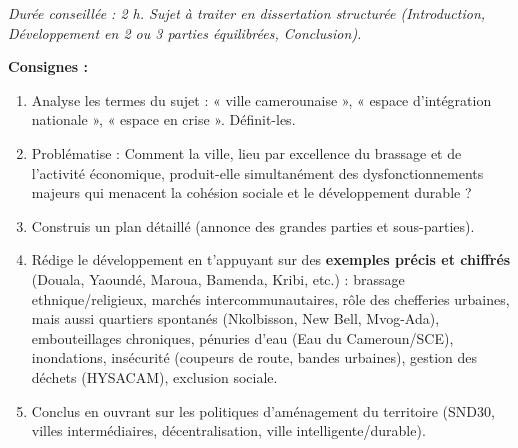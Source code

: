 \documentclass[11pt]{article}
\begin{document}
\begin{exercice}
\emph{Durée conseillée : 2 h. Sujet à traiter en dissertation structurée (Introduction, Développement en 2 ou 3 parties équilibrées, Conclusion).}

\textbf{Consignes :}
\begin{enumerate}
    \item Analyse les termes du sujet : « ville camerounaise », « espace d'intégration nationale », « espace en crise ». Définit-les.
    \item Problématise : Comment la ville, lieu par excellence du brassage et de l'activité économique, produit-elle simultanément des dysfonctionnements majeurs qui menacent la cohésion sociale et le développement durable ?
    \item Construis un plan détaillé (annonce des grandes parties et sous-parties).
    \item Rédige le développement en t'appuyant sur des \textbf{exemples précis et chiffrés} (Douala, Yaoundé, Maroua, Bamenda, Kribi, etc.) : brassage ethnique/religieux, marchés intercommunautaires, rôle des chefferies urbaines, mais aussi quartiers spontanés (Nkolbisson, New Bell, Mvog-Ada), embouteillages chroniques, pénuries d'eau (Eau du Cameroun/SCE), inondations, insécurité (coupeurs de route, bandes urbaines), gestion des déchets (HYSACAM), exclusion sociale.
    \item Conclus en ouvrant sur les politiques d'aménagement du territoire (SND30, villes intermédiaires, décentralisation, ville intelligente/durable).
\end{enumerate}
\end{exercice}
\end{document}
